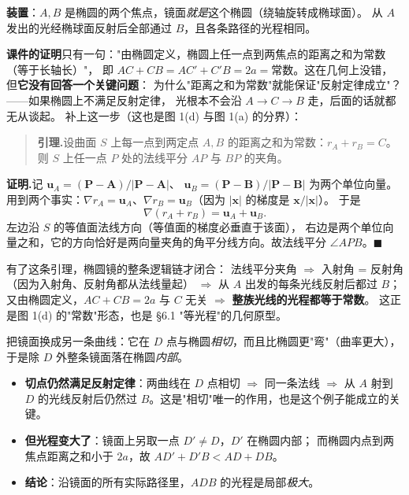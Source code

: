 \documentclass[11pt]{ctexart}
\begin{document}

\textbf{装置}：$A,B$ 是椭圆的两个焦点，镜面\emph{就是}这个椭圆（绕轴旋转成椭球面）。
从 $A$ 发出的光经椭球面反射后全部通过 $B$，且各条路径的光程相同。

\textbf{课件的证明}只有一句："由椭圆定义，椭圆上任一点到两焦点的距离之和为常数（等于长轴长）"，
即 $AC+CB=AC'+C'B=2a=\text{常数}$。这在几何上没错，但\textbf{它没有回答一个关键问题}：
为什么"距离之和为常数"就能保证"反射定律成立"？——如果椭圆上不满足反射定律，
光根本不会沿 $A\to C\to B$ 走，后面的话就都无从谈起。
补上这一步（这也是图 1(d) 与图 1(a) 的分界）：

\begin{quote}
\textbf{引理.}\quad 设曲面 $S$ 上每一点到两定点 $A,B$ 的距离之和为常数：$r_A+r_B=C$。
则 $S$ 上任一点 $P$ 处的法线平分 $AP$ 与 $BP$ 的夹角。
\end{quote}

\textbf{证明.}记 $\mathbf{u}_A=(\mathbf{P}-\mathbf{A})/|\mathbf{P}-\mathbf{A}|$、
$\mathbf{u}_B=(\mathbf{P}-\mathbf{B})/|\mathbf{P}-\mathbf{B}|$ 为两个单位向量。
用到两个事实：$\nabla r_A=\mathbf{u}_A$、$\nabla r_B=\mathbf{u}_B$（因为 $|\mathbf{x}|$ 的梯度是 $\mathbf{x}/|\mathbf{x}|$）。
于是
\[
\nabla(r_A+r_B)=\mathbf{u}_A+\mathbf{u}_B .
\]
左边沿 $S$ 的等值面法线方向（等值面的梯度必垂直于该面），
右边是两个单位向量之和，它的方向恰好是两向量夹角的角平分线方向。故法线平分 $\angle APB$。$\blacksquare$

有了这条引理，椭圆镜的整条逻辑链才闭合：
法线平分夹角 $\Rightarrow$ 入射角 = 反射角（因为入射角、反射角都从法线量起）
$\Rightarrow$ 从 $A$ 出发的每条光线反射后都过 $B$；
又由椭圆定义，$AC+CB=2a$ 与 $C$ 无关 $\Rightarrow$ \textbf{整族光线的光程都等于常数}。
这正是图 1(d) 的"常数"形态，也是 §6.1 "等光程"的几何原型。


把镜面换成另一条曲线：它在 $D$ 点与椭圆\emph{相切}，而且比椭圆更"弯"（曲率更大），
于是除 $D$ 外整条镜面落在椭圆\emph{内部}。

\begin{itemize}
\item \textbf{切点仍然满足反射定律}：两曲线在 $D$ 点相切 $\Rightarrow$ 同一条法线 $\Rightarrow$
从 $A$ 射到 $D$ 的光线反射后仍然过 $B$。这是"相切"唯一的作用，也是这个例子能成立的关键。
\item \textbf{但光程变大了}：镜面上另取一点 $D'\neq D$，$D'$ 在椭圆内部；
而椭圆内点到两焦点距离之和小于 $2a$，故 $AD'+D'B<AD+DB$。
\item \textbf{结论}：沿镜面的所有实际路径里，$ADB$ 的光程是局部\emph{极大}。
\end{itemize}
\end{document}
